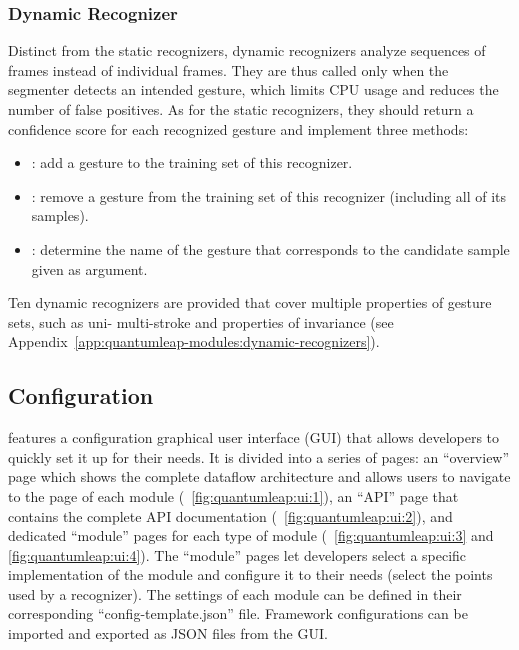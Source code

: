 \subsubsection{Dynamic Recognizer}
Distinct from the static recognizers, dynamic recognizers analyze sequences of frames instead of individual frames. They are thus called only when the segmenter detects an intended gesture, which limits CPU usage and reduces the number of false positives. As for the static recognizers, they should return a confidence score for each recognized gesture and implement three methods:
\begin{itemize}[noitemsep]
    \item {}: add a gesture to the training set of this recognizer. 
    \item {}: remove a gesture from the training set of this recognizer (including all of its samples).
    \item {}: determine the name of the gesture that corresponds to the candidate sample given as argument.
\end{itemize}
Ten dynamic recognizers are provided that cover multiple properties of gesture sets, such as uni- \vs multi-stroke and properties of invariance (see Appendix~\ref{app:quantumleap-modules:dynamic-recognizers}).

\subsection{Configuration} \label{sec:quantumleap:description:configuration}

\ql features a configuration graphical user interface (GUI) that allows developers to quickly set it up for their needs. It is divided into a series of pages: an ``overview'' page which shows the complete dataflow architecture and allows users to navigate to the page of each module (\fig~\ref{fig:quantumleap:ui:1}), an ``API'' page that contains the complete API documentation (\fig~\ref{fig:quantumleap:ui:2}), and dedicated ``module'' pages for each type of module (\fig~\ref{fig:quantumleap:ui:3} and \ref{fig:quantumleap:ui:4}). The ``module'' pages let developers select a specific implementation of the module and configure it to their needs (\eg select the points used by a recognizer). The settings of each module can be defined in their corresponding ``config-template.json'' file. Framework configurations can be imported and exported as JSON files from the GUI.

